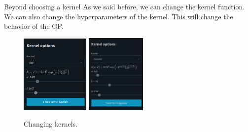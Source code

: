 \documentclass[xcolor=dvipsnames,t,aspectratio=169]{beamer} %
\newcommand{\highlight}[1]{{\color{fgv_light_blue} #1}}
\begin{document}
    

\begin{frame}[c]{Beyond \highlight{choosing} a kernel}
    As we said before, we can change the kernel function. We can also change the \highlight{hyperparameters} of the kernel. This will change the \highlight{behavior} of the GP.

    \begin{figure}[H]
        \centering
        \includegraphics[width=0.30\textwidth]{../imgs/kernel-1.png}
        \includegraphics[width=0.26\textwidth]{../imgs/kernel-2.png}
        \caption{Changing kernels.}
    \end{figure}

\end{frame}

    
\end{document}
